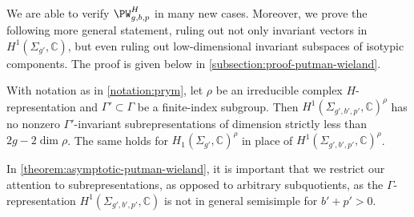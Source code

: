 We are able to verify $\PW_{g,b,p}^H$ in many new cases.
Moreover, we prove the following more general statement, ruling out
not only invariant vectors in $H^1(\Sigma_{g'}, \mathbb C)$, but even ruling out low-dimensional invariant subspaces
of isotypic components.
The proof is given below in \autoref{subsection:proof-putman-wieland}.
\begin{theorem}
\notready
	\label{theorem:asymptotic-putman-wieland}
	With notation as in \autoref{notation:prym}, let $\rho$ be an irreducible
	complex $H$-representation and $\Gamma' \subset \Gamma$ be a finite-index subgroup. Then
	$H^1(\Sigma_{g',b',p'},\mathbb C)^\rho$
	has no nonzero $\Gamma'$-invariant subrepresentations
	of dimension strictly less than $2g - 2\dim \rho$.
	The same holds for
	$H_1(\Sigma_{g'},\mathbb C)^\rho$ in place of
	$H^1(\Sigma_{g',b',p'},\mathbb C)^\rho$.
\end{theorem}

\begin{remark}
\notready
In \autoref{theorem:asymptotic-putman-wieland}, it is important that we restrict our attention to subrepresentations, as opposed to arbitrary subquotients, as the $\Gamma$-representation 	$H^1(\Sigma_{g',b',p'},\mathbb C)$ is not in general semisimple for $b'+p'>0$.
\end{remark}

